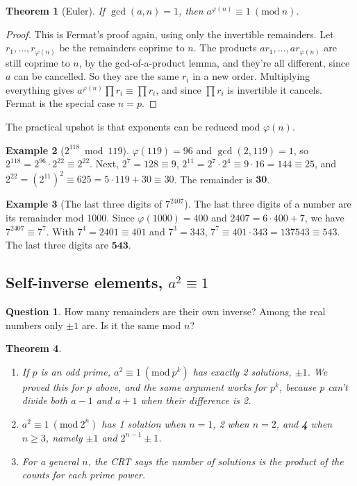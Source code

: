 \documentclass[11pt,a4paper]{article}
\newtheorem{theorem}{Theorem}[section]
\theoremstyle{definition}
\newtheorem{example}[theorem]{Example}
\newcommand{\md}[1]{\ (\mathrm{mod}\ #1)}
\theoremstyle{noteit}
\newtheorem*{question}{Question}
\theoremstyle{note}
\begin{document}
\begin{theorem}[Euler]
If $\gcd(a,n)=1$, then $a^{\varphi(n)}\equiv1\md n$.
\end{theorem}
\begin{proof}
This is Fermat's proof again, using only the invertible remainders. Let $r_1,\dots,r_{\varphi(n)}$ be the remainders coprime to $n$. The products $ar_1,\dots,ar_{\varphi(n)}$ are still coprime to $n$, by the gcd-of-a-product lemma, and they're all different, since $a$ can be cancelled. So they are the same $r_i$ in a new order. Multiplying everything gives $a^{\varphi(n)}\prod r_i\equiv\prod r_i$, and since $\prod r_i$ is invertible it cancels. Fermat is the special case $n=p$.
\end{proof}

The practical upshot is that exponents can be reduced mod $\varphi(n)$.

\begin{example}[$2^{118}\bmod119$]
$\varphi(119)=96$ and $\gcd(2,119)=1$, so $2^{118}=2^{96}\cdot2^{22}\equiv2^{22}$. Next, $2^7=128\equiv9$, $2^{11}=2^7\cdot2^4\equiv9\cdot16=144\equiv25$, and $2^{22}=(2^{11})^2\equiv625=5\cdot119+30\equiv30$. The remainder is $\mathbf{30}$.
\end{example}

\begin{example}[The last three digits of $7^{2407}$]
The last three digits of a number are its remainder mod 1000. Since $\varphi(1000)=400$ and $2407=6\cdot400+7$, we have $7^{2407}\equiv7^7$. With $7^4=2401\equiv401$ and $7^3=343$, $7^7\equiv401\cdot343=137543\equiv543$. The last three digits are $\mathbf{543}$.
\end{example}

\subsection{Self-inverse elements, $a^2\equiv1$}

\begin{question}
How many remainders are their own inverse? Among the real numbers only $\pm1$ are. Is it the same mod $n$?
\end{question}

\begin{theorem}
\begin{enumerate}
\item If $p$ is an odd prime, $a^2\equiv1\md{p^k}$ has exactly 2 solutions, $\pm1$. We proved this for $p$ above, and the same argument works for $p^k$, because $p$ can't divide both $a-1$ and $a+1$ when their difference is 2.
\item $a^2\equiv1\md{2^n}$ has 1 solution when $n=1$, 2 when $n=2$, and \textbf{4} when $n\ge3$, namely $\pm1$ and $2^{n-1}\pm1$.
\item For a general $n$, the CRT says the number of solutions is the product of the counts for each prime power.
\end{enumerate}
\end{theorem}
\end{document}
